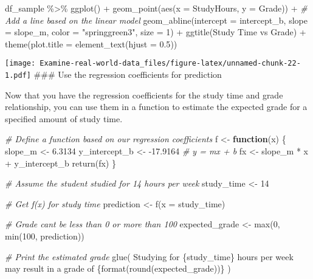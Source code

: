 \documentclass[
]{article}
\newenvironment{Shaded}{\begin{snugshade}}{\end{snugshade}}
\newcommand{\AttributeTok}[1]{\textcolor[rgb]{0.77,0.63,0.00}{#1}}
\newcommand{\CommentTok}[1]{\textcolor[rgb]{0.56,0.35,0.01}{\textit{#1}}}
\newcommand{\ControlFlowTok}[1]{\textcolor[rgb]{0.13,0.29,0.53}{\textbf{#1}}}
\newcommand{\DecValTok}[1]{\textcolor[rgb]{0.00,0.00,0.81}{#1}}
\newcommand{\FloatTok}[1]{\textcolor[rgb]{0.00,0.00,0.81}{#1}}
\newcommand{\FunctionTok}[1]{\textcolor[rgb]{0.00,0.00,0.00}{#1}}
\newcommand{\NormalTok}[1]{#1}
\newcommand{\OtherTok}[1]{\textcolor[rgb]{0.56,0.35,0.01}{#1}}
\newcommand{\SpecialCharTok}[1]{\textcolor[rgb]{0.00,0.00,0.00}{#1}}
\newcommand{\StringTok}[1]{\textcolor[rgb]{0.31,0.60,0.02}{#1}}
\begin{document}
\begin{Shaded}
\begin{Highlighting}[]
\NormalTok{df\_sample }\SpecialCharTok{\%\textgreater{}\%} 
  \FunctionTok{ggplot}\NormalTok{() }\SpecialCharTok{+}
  \FunctionTok{geom\_point}\NormalTok{(}\FunctionTok{aes}\NormalTok{(}\AttributeTok{x =}\NormalTok{ StudyHours, }\AttributeTok{y =}\NormalTok{ Grade)) }\SpecialCharTok{+}
  \CommentTok{\# Add a line based on the linear model}
  \FunctionTok{geom\_abline}\NormalTok{(}\AttributeTok{intercept =}\NormalTok{ intercept\_b, }\AttributeTok{slope =}\NormalTok{ slope\_m, }\AttributeTok{color =} \StringTok{"springgreen3"}\NormalTok{, }\AttributeTok{size =} \DecValTok{1}\NormalTok{) }\SpecialCharTok{+}
  \FunctionTok{ggtitle}\NormalTok{(}\StringTok{\textquotesingle{}Study Time vs Grade\textquotesingle{}}\NormalTok{) }\SpecialCharTok{+}
  \FunctionTok{theme}\NormalTok{(}\AttributeTok{plot.title =} \FunctionTok{element\_text}\NormalTok{(}\AttributeTok{hjust =} \FloatTok{0.5}\NormalTok{))}
\end{Highlighting}
\end{Shaded}

\texttt{[image: Examine-real-world-data\_files/figure-latex/unnamed-chunk-22-1.pdf]}
\#\#\# Use the regression coefficients for prediction

Now that you have the regression coefficients for the study time and
grade relationship, you can use them in a function to estimate the
expected grade for a specified amount of study time.

\begin{Shaded}
\begin{Highlighting}[]
\CommentTok{\# Define a function based on our regression coefficients}
\NormalTok{f }\OtherTok{\textless{}{-}} \ControlFlowTok{function}\NormalTok{(x) \{}
\NormalTok{  slope\_m }\OtherTok{\textless{}{-}}  \FloatTok{6.3134}
\NormalTok{  y\_intercept\_b }\OtherTok{\textless{}{-}}  \SpecialCharTok{{-}}\FloatTok{17.9164}
  \CommentTok{\# y = mx + b}
\NormalTok{  fx }\OtherTok{\textless{}{-}}\NormalTok{  slope\_m }\SpecialCharTok{*}\NormalTok{ x }\SpecialCharTok{+}\NormalTok{ y\_intercept\_b}
  \FunctionTok{return}\NormalTok{(fx)}
\NormalTok{\}}

\CommentTok{\# Assume the student studied for 14 hours per week}
\NormalTok{study\_time }\OtherTok{\textless{}{-}}  \DecValTok{14}

\CommentTok{\# Get f(x) for study time}
\NormalTok{prediction }\OtherTok{\textless{}{-}} \FunctionTok{f}\NormalTok{(}\AttributeTok{x =}\NormalTok{ study\_time)}

\CommentTok{\# Grade can\textquotesingle{}t be less than 0 or more than 100}
\NormalTok{expected\_grade }\OtherTok{\textless{}{-}} \FunctionTok{max}\NormalTok{(}\DecValTok{0}\NormalTok{, }\FunctionTok{min}\NormalTok{(}\DecValTok{100}\NormalTok{, prediction))}

\CommentTok{\# Print the estimated grade}
\FunctionTok{glue}\NormalTok{(}
  \StringTok{\textquotesingle{}Studying for \{study\_time\} hours per week may result in a grade of \{format(round(expected\_grade))\}}
\StringTok{  \textquotesingle{}}\NormalTok{)}
\end{Highlighting}
\end{Shaded}
\end{document}
